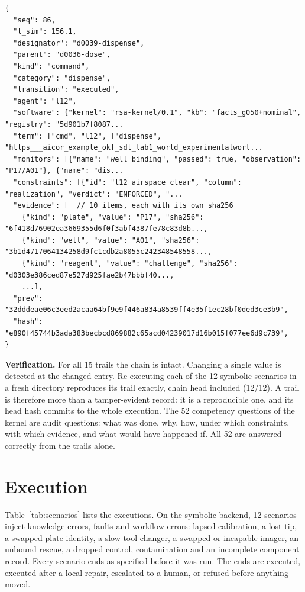 \documentclass[10pt,a4paper]{article}
\begin{document}
\begin{listing}[tbp]
\begin{Verbatim}[fontsize=\footnotesize,breaklines,frame=lines,framesep=2mm]
{
  "seq": 86,
  "t_sim": 156.1,
  "designator": "d0039-dispense",
  "parent": "d0036-dose",
  "kind": "command",
  "category": "dispense",
  "transition": "executed",
  "agent": "l12",
  "software": {"kernel": "rsa-kernel/0.1", "kb": "facts_g050+nominal", "registry": "5d901b7f8087...
  "term": ["cmd", "l12", ["dispense", "https___aicor_example_okf_sdt_lab1_world_experimentalworl...
  "monitors": [{"name": "well_binding", "passed": true, "observation": "P17/A01"}, {"name": "dis...
  "constraints": [{"id": "l12_airspace_clear", "column": "realization", "verdict": "ENFORCED", "...
  "evidence": [  // 10 items, each with its own sha256
    {"kind": "plate", "value": "P17", "sha256": "6f418d76902ea3669355d6f0f3abf4387fe78c83d8b...,
    {"kind": "well", "value": "A01", "sha256": "3b1d4717064134258d9fc1cdb2a8055c242348548558...,
    {"kind": "reagent", "value": "challenge", "sha256": "d0303e386ced87e527d925fae2b47bbbf40...,
    ...],
  "prev": "32dddeae06c3eed2acaa64bf9e9f446a834a8539ff4e35f1ec28bf0ded3ce3b9",
  "hash": "e890f45744b3ada383becbcd869882c65acd04239017d16b015f077ee6d9c739",
}
\end{Verbatim}
\caption{An audit entry (abbreviated; ... marks truncation): a dispense command executed by L12, with its monitors, constraint verdicts and hashed evidence.}\label{lst:audit}
\end{listing}

\textbf{Verification.} For all 15 trails the chain is intact. Changing a single value is detected at the changed entry. Re-executing each of the 12 symbolic scenarios in a fresh directory reproduces its trail exactly, chain head included (12/12). A trail is therefore more than a tamper-evident record: it is a reproducible one, and its head hash commits to the whole execution. The 52 competency questions of the kernel are audit questions: what was done, why, how, under which constraints, with which evidence, and what would have happened if. All 52 are answered correctly from the trails alone.

\section{Execution}\label{sec:exec}

Table~\ref{tab:scenarios} lists the executions. On the symbolic backend, 12 scenarios inject knowledge errors, faults and workflow errors: lapsed calibration, a lost tip, a swapped plate identity, a slow tool changer, a swapped or incapable imager, an unbound rescue, a dropped control, contamination and an incomplete component record. Every scenario ends as specified before it was run. The ends are executed, executed after a local repair, escalated to a human, or refused before anything moved.
\end{document}
